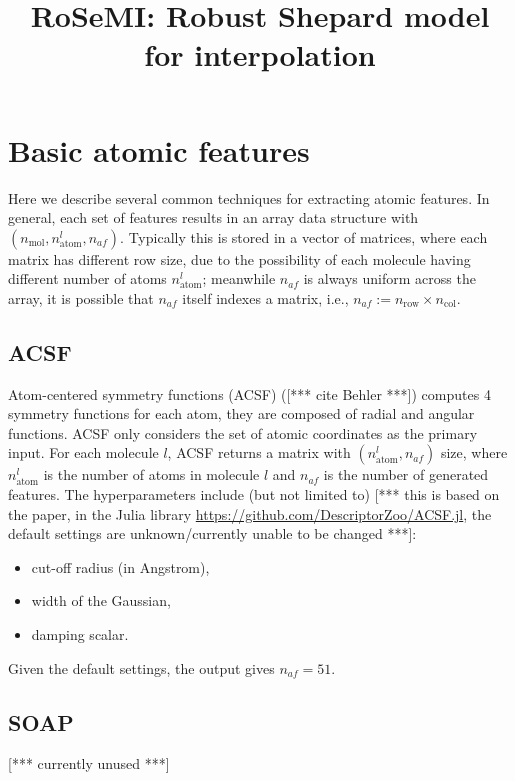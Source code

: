 \documentclass[12pt]{article}
\title{RoSeMI: Robust Shepard model for interpolation}
\def\att{                    %
        \marginpar[ \hspace*{\fill} \raisebox{-0.2em}{\rule{2mm}{1.2em}} ]
        {\raisebox{-0.2em}{\rule{2mm}{1.2em}} }
        }
\def\at#1{[*** \att #1 ***]}  %
\begin{document}
\maketitle

\section{Basic atomic features}
\label{sec:basic_feature}

Here we describe several common techniques for extracting atomic features. In general, each set of features results in an array data structure with $(n_\text{mol}, n^l_\text{atom}, n_{af})$. Typically this is stored in a vector of matrices, where each matrix has different row size, due to the possibility of each molecule having different number of atoms $n^l_\text{atom}$; meanwhile $n_{af}$ is always uniform across the array, it is possible that $n_{af}$ itself indexes a matrix, i.e., $n_{af} := n_\text{row} \times n_\text{col}$. 

\subsection{ACSF}
Atom-centered symmetry functions (ACSF) (\at{cite Behler}) computes 4 symmetry functions for each atom, they are composed of radial and angular functions. ACSF only considers the set of atomic coordinates as the primary input. For each molecule $l$, ACSF returns a matrix with $(n^l_\text{atom}, n_{af})$ size, where $n^l_\text{atom}$ is the number of atoms in molecule $l$ and $n_{af}$ is the number of generated features. The hyperparameters include (but not limited to) \at{this is based on the paper, in the Julia library \url{https://github.com/DescriptorZoo/ACSF.jl}, the default settings are unknown/currently unable to be changed}:
\begin{itemize}
	\item cut-off radius (in Angstrom),
	\item width of the Gaussian,
	\item damping scalar.
\end{itemize}
Given the default settings, the output gives $n_{af} = 51$.

\subsection{SOAP}
\at{currently unused}
\end{document}

